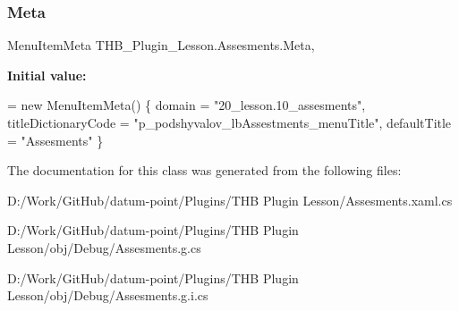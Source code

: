 \subsubsection{\texorpdfstring{Meta}{Meta}}
{\footnotesize\ttfamily Menu\+Item\+Meta T\+H\+B\+\_\+\+Plugin\+\_\+\+Lesson.\+Assesments.\+Meta\hspace{0.3cm}{\ttfamily [get]}, {\ttfamily [set]}}

{\bfseries Initial value\+:}
\begin{DoxyCode}
= \textcolor{keyword}{new} MenuItemMeta()
        \{
            domain = \textcolor{stringliteral}{"20\_lesson.10\_assesments"},
            titleDictionaryCode = \textcolor{stringliteral}{"p\_podshyvalov\_lbAssestments\_menuTitle"},
            defaultTitle = \textcolor{stringliteral}{"Assesments"}
        \}
\end{DoxyCode}


The documentation for this class was generated from the following files\+:\begin{DoxyCompactItemize}
\item 
D\+:/\+Work/\+Git\+Hub/datum-\/point/\+Plugins/\+T\+H\+B Plugin Lesson/Assesments.\+xaml.\+cs\item 
D\+:/\+Work/\+Git\+Hub/datum-\/point/\+Plugins/\+T\+H\+B Plugin Lesson/obj/\+Debug/Assesments.\+g.\+cs\item 
D\+:/\+Work/\+Git\+Hub/datum-\/point/\+Plugins/\+T\+H\+B Plugin Lesson/obj/\+Debug/Assesments.\+g.\+i.\+cs\end{DoxyCompactItemize}
